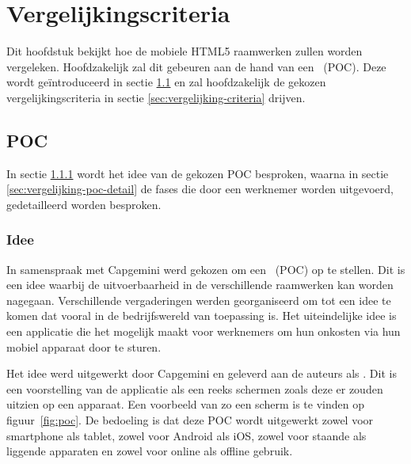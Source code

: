 
\chapter{Vergelijkingscriteria}
\label{chap:vergelijkingscriteria}

Dit hoofdstuk bekijkt hoe de mobiele HTML5 raamwerken zullen worden vergeleken.
Hoofdzakelijk zal dit gebeuren aan de hand van een ~(POC).
Deze wordt geïntroduceerd in sectie \ref{sec:vergelijking-poc} en zal hoofdzakelijk de gekozen vergelijkingscriteria in sectie \ref{sec:vergelijking-criteria} drijven.


\section{POC}
\label{sec:vergelijking-poc}
In sectie \ref{sec:vergelijking-poc-idee} wordt het idee van de gekozen POC besproken, waarna in sectie \ref{sec:vergelijking-poc-detail} de fases die door een werknemer worden uitgevoerd, gedetailleerd worden besproken.

\subsection{Idee}
\label{sec:vergelijking-poc-idee}

In samenspraak met Capgemini werd gekozen om een ~(POC) op te stellen.
Dit is een idee waarbij de uitvoerbaarheid in de verschillende raamwerken kan worden nagegaan.
Verschillende vergaderingen werden georganiseerd om tot een idee te komen dat vooral in de bedrijfswereld van toepassing is.
Het uiteindelijke idee is een applicatie die het mogelijk maakt voor werknemers om hun onkosten via hun mobiel apparaat door te sturen.

Het idee werd uitgewerkt door Capgemini en geleverd aan de auteurs als .
Dit is een voorstelling van de applicatie als een reeks schermen zoals deze er zouden uitzien op een apparaat. 
Een voorbeeld van zo een scherm is te vinden op figuur~\ref{fig:poc}. 
De bedoeling is dat deze POC wordt uitgewerkt zowel voor smartphone als tablet, zowel voor Android als iOS, zowel voor staande als liggende apparaten en zowel voor online als offline gebruik.


